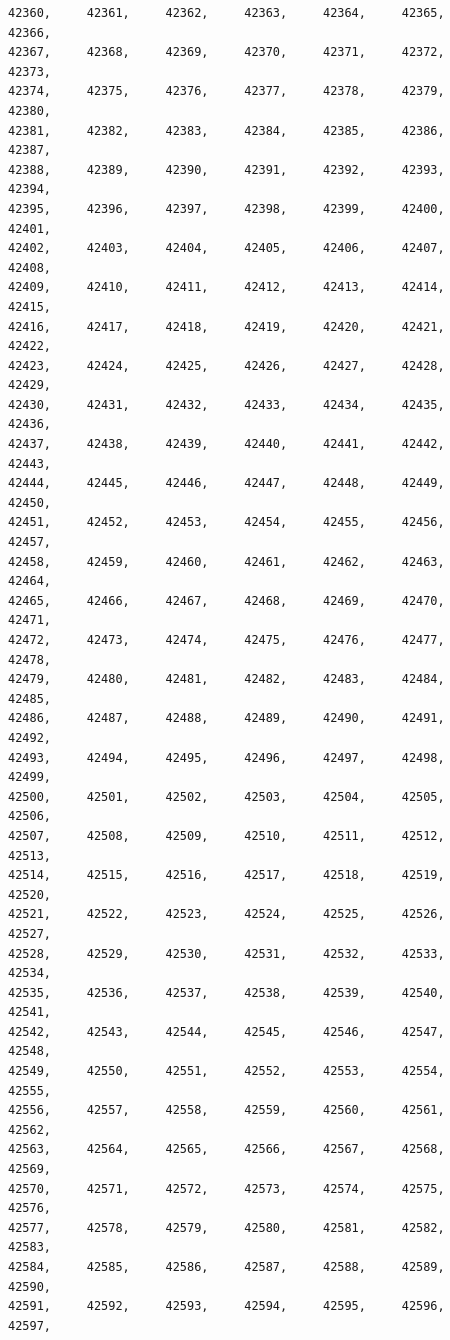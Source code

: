 \documentclass[a4paper,11pt]{report}
\begin{document}
\begin{verbatim}
42360,     42361,     42362,     42363,     42364,     42365,     42366,     
42367,     42368,     42369,     42370,     42371,     42372,     42373,     
42374,     42375,     42376,     42377,     42378,     42379,     42380,     
42381,     42382,     42383,     42384,     42385,     42386,     42387,     
42388,     42389,     42390,     42391,     42392,     42393,     42394,     
42395,     42396,     42397,     42398,     42399,     42400,     42401,     
42402,     42403,     42404,     42405,     42406,     42407,     42408,     
42409,     42410,     42411,     42412,     42413,     42414,     42415,     
42416,     42417,     42418,     42419,     42420,     42421,     42422,     
42423,     42424,     42425,     42426,     42427,     42428,     42429,     
42430,     42431,     42432,     42433,     42434,     42435,     42436,     
42437,     42438,     42439,     42440,     42441,     42442,     42443,     
42444,     42445,     42446,     42447,     42448,     42449,     42450,     
42451,     42452,     42453,     42454,     42455,     42456,     42457,     
42458,     42459,     42460,     42461,     42462,     42463,     42464,     
42465,     42466,     42467,     42468,     42469,     42470,     42471,     
42472,     42473,     42474,     42475,     42476,     42477,     42478,     
42479,     42480,     42481,     42482,     42483,     42484,     42485,     
42486,     42487,     42488,     42489,     42490,     42491,     42492,     
42493,     42494,     42495,     42496,     42497,     42498,     42499,     
42500,     42501,     42502,     42503,     42504,     42505,     42506,     
42507,     42508,     42509,     42510,     42511,     42512,     42513,     
42514,     42515,     42516,     42517,     42518,     42519,     42520,     
42521,     42522,     42523,     42524,     42525,     42526,     42527,     
42528,     42529,     42530,     42531,     42532,     42533,     42534,     
42535,     42536,     42537,     42538,     42539,     42540,     42541,     
42542,     42543,     42544,     42545,     42546,     42547,     42548,     
42549,     42550,     42551,     42552,     42553,     42554,     42555,     
42556,     42557,     42558,     42559,     42560,     42561,     42562,     
42563,     42564,     42565,     42566,     42567,     42568,     42569,     
42570,     42571,     42572,     42573,     42574,     42575,     42576,     
42577,     42578,     42579,     42580,     42581,     42582,     42583,     
42584,     42585,     42586,     42587,     42588,     42589,     42590,     
42591,     42592,     42593,     42594,     42595,     42596,     42597,     

\end{verbatim}
\end{document}
